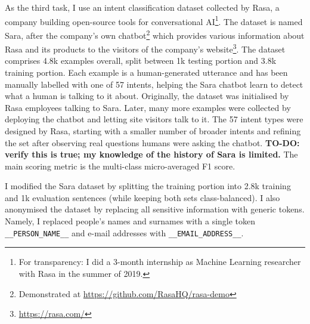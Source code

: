 \documentclass[bsc,frontabs,twoside,singlespacing,parskip,deptreport]{infthesis}
\begin{document}
{{    As the third task, I use an intent classification dataset collected by Rasa, a company building open-source tools for conversational AI\footnote{For transparency: I did a 3-month internship as Machine Learning researcher with Rasa in the summer of 2019.}. The dataset is named Sara, after the company's own chatbot\footnote{Demonstrated at \url{https://github.com/RasaHQ/rasa-demo}} which provides various information about Rasa and its products to the visitors of the company's website\footnote{\url{https://rasa.com/}}. The dataset comprises 4.8k examples overall, split between 1k testing portion and 3.8k training portion. Each example is a human-generated utterance and has been manually labelled with one of 57 intents, helping the Sara chatbot learn to detect what a human is talking to it about. Originally, the dataset was initialised by Rasa employees talking to Sara. Later, many more examples were collected by deploying the chatbot and letting site visitors talk to it. The 57 intent types were designed by Rasa, starting with a smaller number of broader intents and refining the set after observing real questions humans were asking the chatbot. \textbf{TO-DO: verify this is true; my knowledge of the history of Sara is limited.} The main scoring metric is the multi-class micro-averaged F1 score.

    I modified the Sara dataset by splitting the training portion into 2.8k training and 1k evaluation sentences (while keeping both sets class-balanced). I also anonymised the dataset by replacing all sensitive information with generic tokens. Namely, I replaced people's names and surnames with a single token \verb|__PERSON_NAME__| and e-mail addresses with \verb|__EMAIL_ADDRESS__|.
  }

}
\end{document}
